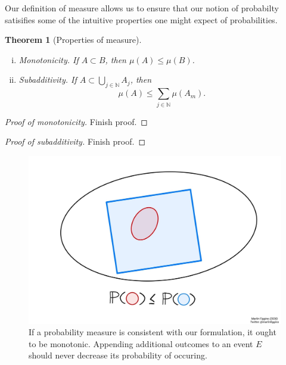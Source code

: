 \documentclass[12pt]{article}
\newcommand{\bbN}{\mathbb{N}}
\newtheorem{thm}{Theorem}[section]
\theoremstyle{definition}
\theoremstyle{remark}
\numberwithin{equation}{section}
\begin{document}
 Our definition of measure allows us to ensure that our notion of probabilty satisifies some of the intuitive properties one might expect of probabilities.

 \begin{thm}[Properties of measure]\leavevmode
   \begin{enumerate}[(i)]
     \item \emph{Monotonicity.} If $A\subset B$, then $\mu(A) \leq  \mu(B)$.
   \item \emph{Subadditivity.} If $A\subset \bigcup_{j\in\bbN} A_j$, then 
        \begin{equation}
        \mu(A) \leq \sum_{j\in\bbN} \mu(A_m).
        \end{equation}
 \end{enumerate}
 \end{thm}

 \begin{proof}[Proof of monotonicity]
   Finish proof. 
 \end{proof}

 \begin{proof}[Proof of subadditivity]
  Finish proof. 
 \end{proof}
 
 \begin{figure}[ht]
   \centering
   \includegraphics[width=0.6\linewidth]{intro-to-prob-subset-ineq.jpg}
   \caption{If a probability measure is consistent with our formulation, it ought to be monotonic. Appending additional outcomes to an event $E$ should never decrease its probability of occuring. }%
   \label{fig:intro-to-prob-subset-ineq}
 \end{figure}
\end{document}
